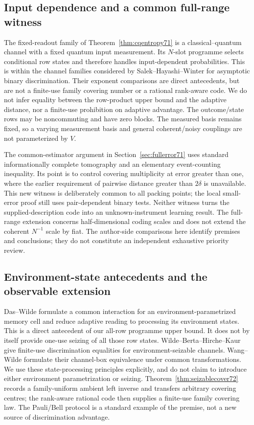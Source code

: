 \subsection{Input dependence and a common full-range witness}
The fixed-readout family of Theorem~\ref{thm:cqentropy71} is a
classical--quantum channel with a fixed quantum input measurement.
Its $N$-slot programme selects conditional row states and therefore
handles input-dependent probabilities. This is within the channel
families considered by Salek--Hayashi--Winter
\cite[Sections~II and V]{SHW68} for asymptotic binary discrimination.
Their exponent comparisons are direct antecedents, but are not a
finite-use family covering number or a rational rank-aware code.
We do not infer equality between the row-product upper bound and the
adaptive distance, nor a finite-use prohibition on adaptive advantage.
The outcome/state rows may be noncommuting and have zero blocks.
The measured basis remains fixed, so a varying measurement basis and
general coherent/noisy couplings are not parameterized by $V$.

The common-estimator argument in Section~\ref{sec:fullerror71} uses
standard informationally complete tomography \cite{PLS66} and an
elementary event-counting inequality. Its point is to control covering
multiplicity at error greater than one, where the earlier requirement
of pairwise distance greater than $2\delta$ is unavailable. This new
witness is deliberately common to all packing points; the local
small-error proof still uses pair-dependent binary tests. Neither
witness turns the supplied-description code into an unknown-instrument
learning result. The full-range extension concerns half-dimensional
coding scales and does not extend the coherent $N^{-1}$ scale by fiat.
The author-side comparisons here identify premises and conclusions;
they do not constitute an independent exhaustive priority review.


\subsection{Environment-state antecedents and the observable extension}
Das--Wilde \cite[Definition~3 and Proposition~2]{DW72} formulate a
common interaction for an environment-parametrized memory cell and
reduce adaptive reading to processing its environment states. This is
a direct antecedent of our all-row programme upper bound. It does not
by itself provide one-use seizing of all those row states.
Wilde--Berta--Hirche--Kaur \cite[Definition~36 and Theorem~37]{WBHK72}
give finite-use discrimination equalities for environment-seizable
channels. Wang--Wilde \cite[Section~III.A]{WW72} formulate their
channel-box equivalence under common transformations. We use these
state-processing principles explicitly, and do not claim to introduce
either environment parametrization or seizing. Theorem~\ref{thm:seizablecover72}
records a family-uniform ambient left inverse and transfers arbitrary
covering centres; the rank-aware rational code then supplies a
finite-use family covering law. The Pauli/Bell protocol is a standard
example of the premise, not a new source of discrimination advantage.

